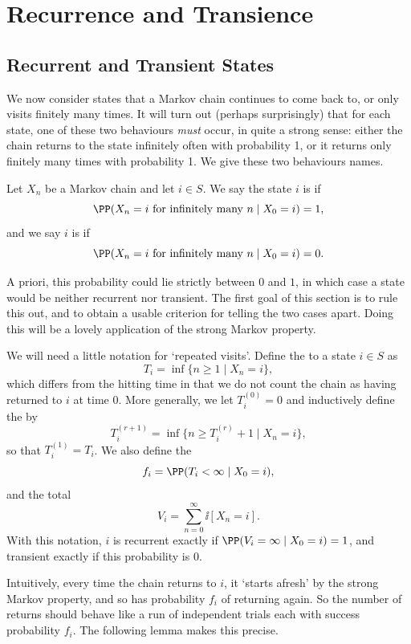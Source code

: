 \documentclass[a4paper]{scrartcl}
\begin{document}
\section{Recurrence and Transience}

\subsection{Recurrent and Transient States}

We now consider states that a Markov chain continues to come back to, or only visits finitely many times. It will turn out (perhaps surprisingly) that for each state, one of these two behaviours \emph{must} occur, in quite a strong sense: either the chain returns to the state infinitely often with probability 1, or it returns only finitely many times with probability 1. We give these two behaviours names.

\begin{definition}
	Let $X_n$ be a Markov chain and let $i \in S$. We say the state $i$ is  if
	$$
	\PP(X_n = i \text{ for infinitely many } n \mid X_0 = i) = 1,
	$$
	and we say $i$ is  if
	$$
	\PP(X_n = i \text{ for infinitely many } n \mid X_0 = i) = 0.
	$$
\end{definition}

A priori, this probability could lie strictly between $0$ and $1$, in which case a state would be neither recurrent nor transient. The first goal of this section is to rule this out, and to obtain a usable criterion for telling the two cases apart. Doing this will be a lovely application of the strong Markov property.

We will need a little notation for `repeated visits'. Define the  to a state $i \in S$ as
$$
T_i = \inf\{n \geq 1 \mid X_n = i\},
$$
which differs from the hitting time in that we do not count the chain as having returned to $i$ at time 0. More generally, we let $T_i^{(0)} = 0$ and inductively define the  by
$$
T_i^{(r + 1)} = \inf\{n \geq T_i^{(r)} + 1 \mid X_n = i\},
$$
so that $T_i^{(1)} = T_i$. We also define the 
$$
f_i = \PP(T_i < \infty \mid X_0 = i),
$$
and the total 
$$
V_i = \sum_{n = 0}^{\infty} \ii[X_n = i].
$$
With this notation, $i$ is recurrent exactly if $\PP(V_i = \infty \mid X_0 = i) = 1$, and transient exactly if this probability is 0.

Intuitively, every time the chain returns to $i$, it `starts afresh' by the strong Markov property, and so has probability $f_i$ of returning again. So the number of returns should behave like a run of independent trials each with success probability $f_i$. The following lemma makes this precise.
\end{document}
